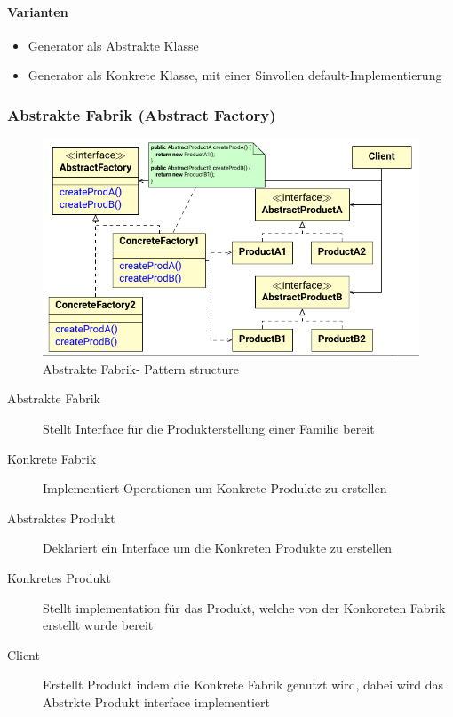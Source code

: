 \documentclass[
    ngerman,
    color=3b,
    summary,
    boxarc,
    main,
]{rubos-tuda-template}
\begin{document}
\paragraph{Varianten}
\begin{itemize}
    \item Generator als Abstrakte Klasse
    \item Generator als Konkrete Klasse, mit einer Sinvollen default-Implementierung
\end{itemize}
\clearpage
\subsubsection{Abstrakte Fabrik (Abstract Factory)}
\begin{figure}[ht]
    \centering
    \includegraphics[width=.7\textwidth]{bilder/SE_08_DesignPatterns-seiten-37_cropped.pdf}
    \caption{Abstrakte Fabrik- Pattern structure}
\end{figure}
\FloatBarrier
\begin{description}
    \item[Abstrakte Fabrik] Stellt Interface für die Produkterstellung einer Familie bereit
    \item[Konkrete Fabrik] Implementiert Operationen um Konkrete Produkte zu erstellen
    \item[Abstraktes Produkt] Deklariert ein Interface um die Konkreten Produkte zu erstellen
    \item[Konkretes Produkt] Stellt implementation für das Produkt, welche von der Konkoreten Fabrik erstellt wurde bereit
    \item[Client] Erstellt Produkt indem die Konkrete Fabrik genutzt wird, dabei wird das Abstrkte Produkt interface implementiert
\end{description}
\end{document}
